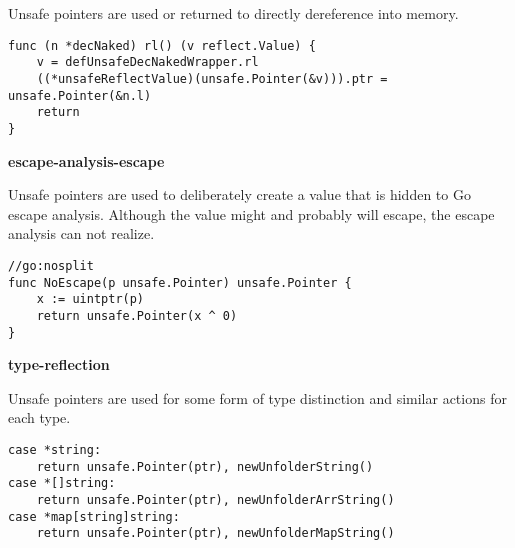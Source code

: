 Unsafe pointers are used or returned to directly dereference into memory.

\begin{lstlisting}[language=Golang, label=lst:survey-small-classexample-direct-memory-access, caption=Usage class example: direct-memory-access]
func (n *decNaked) rl() (v reflect.Value) {
    v = defUnsafeDecNakedWrapper.rl
    ((*unsafeReflectValue)(unsafe.Pointer(&v))).ptr = unsafe.Pointer(&n.l)
    return
}
\end{lstlisting}


\textbf{escape-analysis-escape}

Unsafe pointers are used to deliberately create a value that is hidden to Go escape analysis.
Although the value might and probably will escape, the escape analysis can not realize.

\begin{lstlisting}[language=Golang, label=lst:survey-small-classexample-escape-analysis-escape, caption=Usage class example: escape-analysis-escape]
//go:nosplit
func NoEscape(p unsafe.Pointer) unsafe.Pointer {
    x := uintptr(p)
    return unsafe.Pointer(x ^ 0)
}
\end{lstlisting}


\textbf{type-reflection}

Unsafe pointers are used for some form of type distinction and similar actions for each type.

\begin{lstlisting}[language=Golang, label=lst:survey-small-classexample-type-reflection, caption=Usage class example: type-reflection]
case *string:
    return unsafe.Pointer(ptr), newUnfolderString()
case *[]string:
    return unsafe.Pointer(ptr), newUnfolderArrString()
case *map[string]string:
    return unsafe.Pointer(ptr), newUnfolderMapString()
\end{lstlisting}
